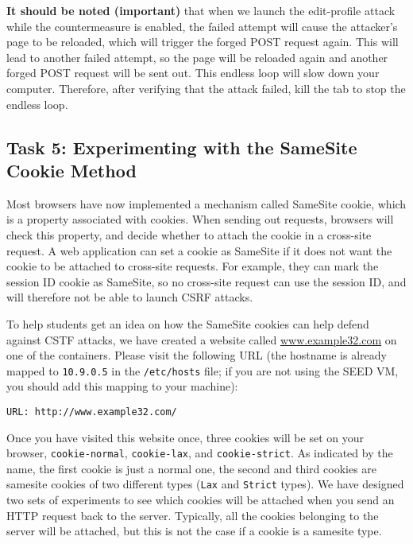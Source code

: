 \textbf{It should be noted (important)} that when we launch the edit-profile attack
while the countermeasure is enabled, the failed attempt will
cause the attacker's page to be reloaded, which will
trigger the forged POST request again. This will lead to another 
failed attempt, so the page will be reloaded again and 
another forged POST request will be sent out. This endless loop
will slow down your computer. Therefore, after verifying that 
the attack failed, kill the tab to stop the endless loop. 



\subsection{Task 5: Experimenting with the SameSite Cookie Method} 

Most browsers have now implemented a mechanism called SameSite cookie, 
which is a property associated with cookies. When sending out 
requests, browsers will check this property, and decide whether 
to attach the cookie in a cross-site request. A web application can
set a cookie as SameSite if it does not want the cookie to be 
attached to cross-site requests. For example, they can mark
the session ID cookie as SameSite, so no cross-site request
can use the session ID, and will therefore not be able to 
launch CSRF attacks. 


To help students get an idea on how the SameSite cookies can
help defend against CSTF attacks, we have created a website
called \url{www.example32.com} on one of the containers. Please 
visit the following URL (the hostname is already mapped 
to \texttt{10.9.0.5} in the \texttt{/etc/hosts} file; if you are 
not using the SEED VM, you should add this mapping to your machine): 

\begin{lstlisting}
URL: http://www.example32.com/
\end{lstlisting}

Once you have visited this website once, three cookies will be 
set on your browser, \texttt{cookie-normal}, \texttt{cookie-lax},
and \texttt{cookie-strict}. As indicated by the name,
the first cookie is just a normal one, the second and third cookies
are samesite cookies of two different types (\texttt{Lax} and \texttt{Strict}
types). We have designed two sets of experiments to see 
which cookies will be attached when you send an HTTP request
back to the server. Typically, all the cookies belonging to the server
will be attached, but this is not the case if a cookie is a samesite type. 


